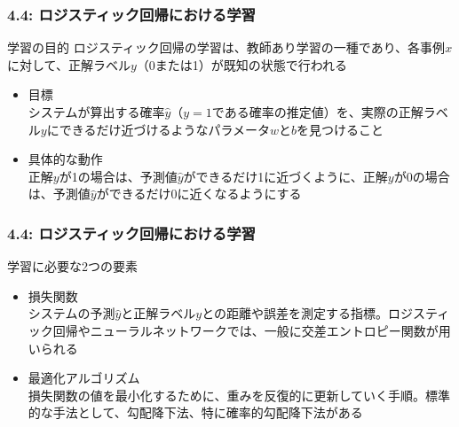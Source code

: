 \documentclass[unicode,11pt]{beamer} %
\begin{document}
\begin{frame}
    \frametitle{4.4: ロジスティック回帰における学習}
    \begin{alertblock}{学習の目的}
        ロジスティック回帰の学習は、教師あり学習の一種であり、各事例$x$に対して、正解ラベル$y$（0または1）が既知の状態で行われる
        \begin{itemize}
            \item 目標\\システムが算出する確率$\hat{y}$（$y = 1$である確率の推定値）を、実際の正解ラベル$y$にできるだけ近づけるようなパラメータ$w$と$b$を見つけること
            \item 具体的な動作\\正解$y$が1の場合は、予測値$\hat{y}$ができるだけ1に近づくように、正解$y$が0の場合は、予測値$\hat{y}$ができるだけ0に近くなるようにする
        \end{itemize}
    \end{alertblock}
\end{frame}

\begin{frame}
    \frametitle{4.4: ロジスティック回帰における学習}
    \begin{alertblock}{学習に必要な2つの要素}
        \begin{itemize}
            \item 損失関数\\システムの予測$\hat{y}$と正解ラベル$y$との距離や誤差を測定する指標。ロジスティック回帰やニューラルネットワークでは、一般に交差エントロピー関数が用いられる
            \item 最適化アルゴリズム\\損失関数の値を最小化するために、重みを反復的に更新していく手順。標準的な手法として、勾配降下法、特に確率的勾配降下法がある
        \end{itemize}
    \end{alertblock}
\end{frame}

\end{document}
